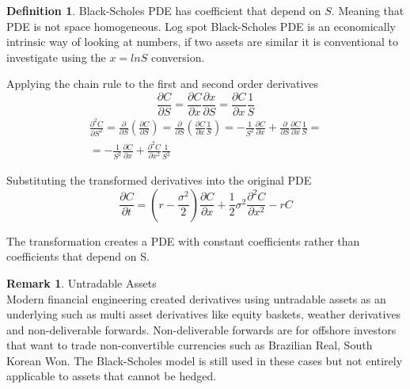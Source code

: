 \documentclass[12pt, oneside]{book}
\theoremstyle{plain}
\theoremstyle{definition}
\newtheorem{definition}[theorem]{Definition}
\newtheorem{remark}[theorem]{Remark}
\begin{document}
\begin{definition} 
Black-Scholes PDE has coefficient that depend on $S$. Meaning that PDE is not space homogeneous. Log spot Black-Scholes PDE is an economically intrinsic way of looking at numbers, if two assets are similar it is conventional to investigate using the $x = ln S$ conversion. 

Applying the chain rule to the first and second order derivatives
\begin{equation}
\frac{\partial C}{\partial S} = \frac{\partial C}{\partial x} \frac{\partial x}{\partial S} = \frac{\partial C}{\partial x} \frac{1}{S}
\end{equation}
\begin{eqnarray}
\frac{\partial^2 C}{\partial S^2} = \frac{\partial }{\partial S} (\frac{\partial C}{\partial S}) = \frac{\partial }{\partial S} (\frac{\partial C}{\partial x} \frac{1}{S}) = -\frac{1}{S^2} \frac{\partial C}{\partial x} + \frac{\partial }{\partial S} \frac{\partial C}{\partial x} \frac{1}{S} = \\
 = -\frac{1}{S^2} \frac{\partial C}{\partial x} + \frac{\partial^2 C}{\partial x^2} \frac{1}{S^2} 
\end{eqnarray}

Substituting the transformed derivatives into the original PDE 
\begin{equation}
\frac{\partial C}{\partial t} = (r - \frac{\sigma^2}{2})\frac{\partial C}{\partial x}+\frac{1}{2} \sigma^2 \frac{\partial^2 C}{\partial x^2} - rC
\end{equation}

The transformation creates a PDE with constant coefficients rather than coefficients that depend on S. 

\end{definition}
\begin{remark}Untradable Assets\\ Modern financial engineering created derivatives using untradable assets as an underlying such as multi asset derivatives like equity baskets, weather derivatives and non-deliverable forwards. Non-deliverable forwards are for offshore investors that want to trade non-convertible currencies such as Brazilian Real, South Korean Won.  The Black-Scholes model is still used in these cases \cite{weather} \cite{basket} but not entirely applicable to assets that cannot be hedged.
\end{remark}
\end{document}
